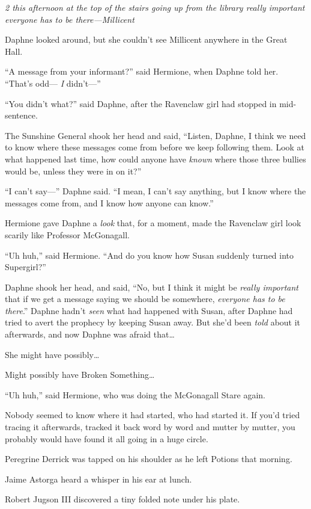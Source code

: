 \emph{2 this afternoon at the top of the stairs going up from the library \emph{really important} everyone has to be there—Millicent}

Daphne looked around, but she couldn’t see Millicent anywhere in the Great Hall.

“A message from your informant?” said Hermione, when Daphne told her. “That’s odd— \emph{I} didn’t—”

“You didn’t what?” said Daphne, after the Ravenclaw girl had stopped in mid-sentence.

The Sunshine General shook her head and said, “Listen, Daphne, I think we need to know where these messages come from before we keep following them. Look at what happened last time, how could anyone have \emph{known} where those three bullies would be, unless they were in on it?”

“I can’t say—” Daphne said. “I mean, I can’t say anything, but I know where the messages come from, and I know how anyone can know.”

Hermione gave Daphne a \emph{look} that, for a moment, made the Ravenclaw girl look scarily like Professor McGonagall.

“Uh huh,” said Hermione. “And do you know how Susan suddenly turned into Supergirl?”

Daphne shook her head, and said, “No, but I think it might be \emph{really important} that if we get a message saying we should be somewhere, \emph{everyone has to be there}.” Daphne hadn’t \emph{seen} what had happened with Susan, after Daphne had tried to avert the prophecy by keeping Susan away. But she’d been \emph{told} about it afterwards, and now Daphne was afraid that…

She might have possibly…

Might possibly have Broken Something…

“Uh huh,” said Hermione, who was doing the McGonagall Stare again.

\later

Nobody seemed to know where it had started, who had started it. If you’d tried tracing it afterwards, tracked it back word by word and mutter by mutter, you probably would have found it all going in a huge circle.

Peregrine Derrick was tapped on his shoulder as he left Potions that morning.

Jaime Astorga heard a whisper in his ear at lunch.

Robert Jugson III discovered a tiny folded note under his plate.


